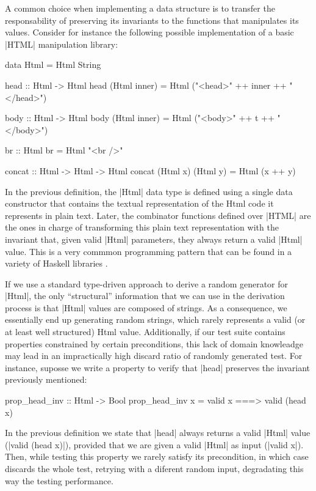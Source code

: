 A common choice when implementing a data structure is to transfer the
responsability of preserving its invariants to the functions that manipulates
its values.
%
Consider for instance the following possible implementation of a basic |HTML|
manipulation library:

\begin{code}
data Html = Html String

head :: Html -> Html
head (Html inner)
  = Html ("<head>" ++ inner ++ "</head>")

body :: Html -> Html
body (Html inner)
  = Html ("<body>" ++ t ++ "</body>")

br :: Html
br = Html "<br />"

concat :: Html -> Html -> Html
concat (Html x) (Html y) = Html (x ++ y)
\end{code}

In the previous definition, the |Html| data type is defined using a single data
constructor that contains the textual representation of the Html code it
represents in plain text.
%
Later, the combinator functions defined over |HTML| are the ones in charge of
transforming this plain text representation with the invariant that, given valid
|Html| parameters, they always return a valid |Html| value.
%
This is a very commmon programming pattern that can be found in a variety of
Haskell libraries \tocite{}.


If we use a standard type-driven approach to derive a random generator for
|Html|, the only ``structural'' information that we can use in the derivation
process is that |Html| values are composed of strings.
%
As a consequence, we essentially end up generating random strings, which rarely
represents a valid (or at least well structured) Html value.
%
Additionally, if our test suite contains properties constrained by certain
preconditions, this lack of domain knowleadge may lead in an impractically high
discard ratio of randomly generated test.
%
For instance, suposse we write a property to verify that |head| preserves the
invariant previously mentioned:

\begin{code}
prop_head_inv :: Html -> Bool
prop_head_inv x = valid x ===> valid (head x)
\end{code}

In the previous definition we state that |head| always returns a valid |Html|
value (|valid (head x)|), provided that we are given a valid |Html| as input
(|valid x|).
%
Then, while testing this property we rarely satisfy its precondition, in which
case \quickcheck discards the whole test, retrying with a diferent random input,
degradating this way the testing performance.


